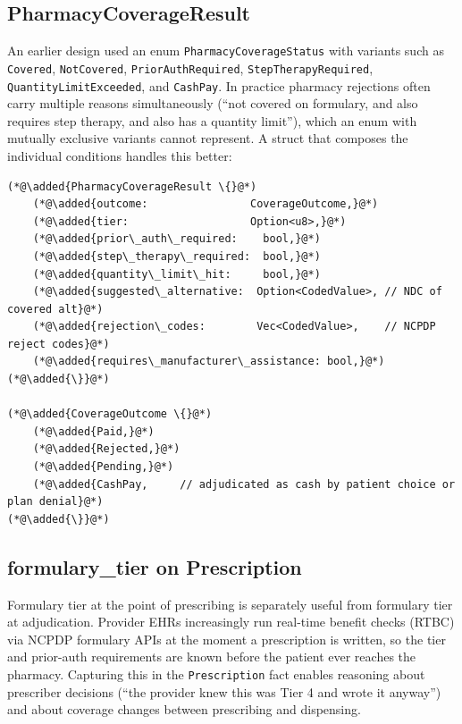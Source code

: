 \documentclass[11pt]{article}
\newcommand{\added}[1]{\textcolor{accentblue}{#1}}
\begin{document}
\subsection{PharmacyCoverageResult}
\label{sec:pharmacy-coverage-result}

An earlier design used an enum \texttt{PharmacyCoverageStatus} with
variants such as \texttt{Covered}, \texttt{NotCovered},
\texttt{PriorAuthRequired}, \texttt{StepTherapyRequired},
\texttt{QuantityLimitExceeded}, and \texttt{CashPay}. In practice
pharmacy rejections often carry multiple reasons simultaneously
(``not covered on formulary, and also requires step therapy, and also
has a quantity limit''), which an enum with mutually exclusive variants
cannot represent. A struct that composes the individual conditions
handles this better:

\begin{lstlisting}
(*@\added{PharmacyCoverageResult \{}@*)
    (*@\added{outcome:                CoverageOutcome,}@*)
    (*@\added{tier:                   Option<u8>,}@*)
    (*@\added{prior\_auth\_required:    bool,}@*)
    (*@\added{step\_therapy\_required:  bool,}@*)
    (*@\added{quantity\_limit\_hit:     bool,}@*)
    (*@\added{suggested\_alternative:  Option<CodedValue>, // NDC of covered alt}@*)
    (*@\added{rejection\_codes:        Vec<CodedValue>,    // NCPDP reject codes}@*)
    (*@\added{requires\_manufacturer\_assistance: bool,}@*)
(*@\added{\}}@*)

(*@\added{CoverageOutcome \{}@*)
    (*@\added{Paid,}@*)
    (*@\added{Rejected,}@*)
    (*@\added{Pending,}@*)
    (*@\added{CashPay,     // adjudicated as cash by patient choice or plan denial}@*)
(*@\added{\}}@*)
\end{lstlisting}

\subsection{formulary\_tier on Prescription}
\label{sec:formulary-tier}

Formulary tier at the point of prescribing is separately useful from
formulary tier at adjudication. Provider EHRs increasingly run
real-time benefit checks (RTBC) via NCPDP formulary APIs at the moment
a prescription is written, so the tier and prior-auth requirements
are known before the patient ever reaches the pharmacy. Capturing
this in the \texttt{Prescription} fact enables reasoning about
prescriber decisions (``the provider knew this was Tier 4 and wrote
it anyway'') and about coverage changes between prescribing and
dispensing.
\end{document}
